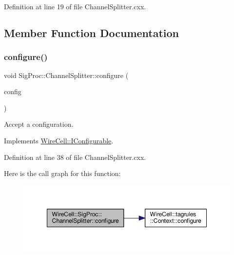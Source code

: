 Definition at line 19 of file Channel\+Splitter.\+cxx.



\subsection{Member Function Documentation}
\mbox{\label{class_wire_cell_1_1_sig_proc_1_1_channel_splitter_a843b48ddc563591f31a8c51f3d46dbe5}} 
\subsubsection{\texorpdfstring{configure()}{configure()}}
{\footnotesize\ttfamily void Sig\+Proc\+::\+Channel\+Splitter\+::configure (\begin{DoxyParamCaption}\item[{const \hyperlink{namespace_wire_cell_a9f705541fc1d46c608b3d32c182333ee}{Wire\+Cell\+::\+Configuration} \&}]{config }\end{DoxyParamCaption})\hspace{0.3cm}{\ttfamily [virtual]}}



Accept a configuration. 



Implements \hyperlink{class_wire_cell_1_1_i_configurable_a57ff687923a724093df3de59c6ff237d}{Wire\+Cell\+::\+I\+Configurable}.



Definition at line 38 of file Channel\+Splitter.\+cxx.

Here is the call graph for this function\+:
\nopagebreak
\begin{figure}[H]
\begin{center}
\leavevmode
\includegraphics[width=348pt]{class_wire_cell_1_1_sig_proc_1_1_channel_splitter_a843b48ddc563591f31a8c51f3d46dbe5_cgraph}
\end{center}
\end{figure}
\mbox{\label{class_wire_cell_1_1_sig_proc_1_1_channel_splitter_a3e7deb7d0ebe470ff7748f015eee0f9c}} 
